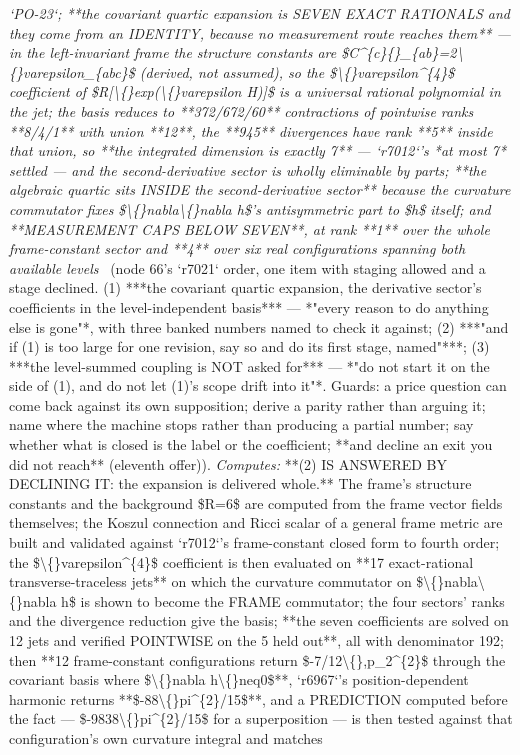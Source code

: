 \begin{description}
\textit{`PO-23`;  **the covariant quartic expansion is SEVEN EXACT RATIONALS and they come from an IDENTITY, because no measurement route reaches them** --- in the left-invariant frame the structure constants are \$C\textasciicircum{}\{c\}\{\}\_\{ab\}=2\textbackslash\{\}varepsilon\_\{abc\}\$ (derived, not assumed), so the \$\textbackslash\{\}varepsilon\textasciicircum{}\{4\}\$ coefficient of \$R[\textbackslash\{\}exp(\textbackslash\{\}varepsilon H)]\$ is a universal rational polynomial in the jet; the basis reduces to **372/672/60** contractions of pointwise ranks **8/4/1** with union **12**, the **945** divergences have rank **5** inside that union, so **the integrated dimension is exactly 7** --- `r7012`'s *at most 7* settled --- and the second-derivative sector is wholly eliminable by parts; **the algebraic quartic sits INSIDE the second-derivative sector** because the curvature commutator fixes \$\textbackslash\{\}nabla\textbackslash\{\}nabla h\$'s antisymmetric part to \$h\$ itself; and **MEASUREMENT CAPS BELOW SEVEN**, at rank **1** over the whole frame-constant sector and **4** over six real configurations spanning both available levels} \ (node 66's `r7021` order, one item with staging allowed and a stage declined. (1) ***the covariant quartic expansion, the derivative sector's coefficients in the level-independent basis*** --- *"every reason to do anything else is gone"*, with three banked numbers named to check it against; (2) ***"and if (1) is too large for one revision, say so and do its first stage, named"***; (3) ***the level-summed coupling is NOT asked for*** --- *"do not start it on the side of (1), and do not let (1)'s scope drift into it"*.  Guards: a price question can come back against its own supposition; derive a parity rather than arguing it; name where the machine stops rather than producing a partial number; say whether what is closed is the label or the coefficient; **and decline an exit you did not reach** (eleventh offer)). 
\emph{Computes:} **(2) IS ANSWERED BY DECLINING IT: the expansion is delivered whole.** The frame's structure constants and the background \$R=6\$ are computed from the frame vector fields themselves; the Koszul connection and Ricci scalar of a general frame metric are built and validated against `r7012`'s frame-constant closed form to fourth order; the \$\textbackslash\{\}varepsilon\textasciicircum{}\{4\}\$ coefficient is then evaluated on **17 exact-rational transverse-traceless jets** on which the curvature commutator on \$\textbackslash\{\}nabla\textbackslash\{\}nabla h\$ is shown to become the FRAME commutator; the four sectors' ranks and the divergence reduction give the basis; **the seven coefficients are solved on 12 jets and verified POINTWISE on the 5 held out**, all with denominator 192; then **12 frame-constant configurations return \$-7/12\textbackslash\{\},p\_2\textasciicircum{}\{2\}\$ through the covariant basis where \$\textbackslash\{\}nabla h\textbackslash\{\}neq0\$**, `r6967`'s position-dependent harmonic returns **\$-88\textbackslash\{\}pi\textasciicircum{}\{2\}/15\$**, and a PREDICTION computed before the fact --- \$-9838\textbackslash\{\}pi\textasciicircum{}\{2\}/15\$ for a superposition --- is then tested against that configuration's own curvature integral and matches

\end{description}
